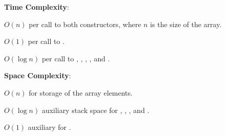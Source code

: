 \textbf{Time Complexity}:
\begin{compactitem}
  \item $O(n)$ per call to both constructors, where $n$ is the size of the array.
  \item $O(1)$ per call to .
  \item $O(\log n)$ per call to , , , , and .
\end{compactitem}

\textbf{Space Complexity}:
\begin{compactitem}
  \item $O(n)$ for storage of the array elements.
  \item $O(\log n)$ auxiliary stack space for , , , and .
  \item $O(1)$ auxiliary for .
\end{compactitem}

